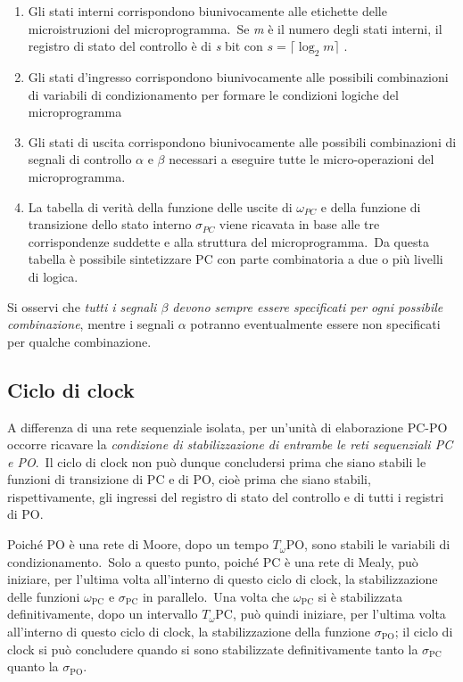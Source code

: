 \begin{enumerate}
    \item Gli stati interni corrispondono biunivocamente alle etichette delle microistruzioni del microprogramma.\ Se \textit{m} è il numero degli stati interni, il registro di stato del controllo è di \textit{s} bit con $s= \lceil \log_2m\rceil$ .
    \item Gli stati d'ingresso corrispondono biunivocamente alle possibili combinazioni di variabili di condizionamento per formare le condizioni logiche del microprogramma
    \item Gli stati di uscita corrispondono biunivocamente alle possibili combinazioni di segnali di controllo $\alpha$ e $\beta$ necessari a eseguire tutte le micro-operazioni del microprogramma.
    \item La tabella di verità della funzione delle uscite di $\omega_{PC}$ e della funzione di transizione dello stato interno $\sigma_{PC}$ viene ricavata in base alle tre corrispondenze suddette e alla struttura del microprogramma.\ Da questa tabella è possibile sintetizzare PC con parte combinatoria a due o più livelli di logica.
\end{enumerate}

\noindent Si osservi che \textit{tutti i segnali $\beta$ devono sempre essere specificati per ogni possibile combinazione}, mentre i segnali $\alpha$ potranno eventualmente essere non specificati per qualche combinazione.

\subsection{Ciclo di clock}

A differenza di una rete sequenziale isolata, per un'unità di elaborazione PC-PO occorre ricavare la \textit{condizione di stabilizzazione di entrambe le reti sequenziali PC e PO}.\
Il ciclo di clock non può dunque concludersi prima che siano stabili le funzioni di transizione di PC e di PO, cioè prima che siano stabili, rispettivamente, gli ingressi del registro di stato del controllo e di tutti i registri di PO.

Poiché PO è una rete di Moore, dopo un tempo $T_\omega\mathrm{PO}$, sono stabili le variabili di condizionamento.\
Solo a questo punto, poiché PC è una rete di Mealy, può iniziare, per l'ultima volta all'interno di questo ciclo di clock, la stabilizzazione delle funzioni $\omega_{\mathrm{PC}}$ e $\sigma_{\mathrm{PC}}$ in parallelo.\
Una volta che $\omega_{\mathrm{PC}}$ si è stabilizzata definitivamente, dopo un intervallo $T_{\omega}\mathrm{PC}$, può quindi iniziare, per l'ultima volta all'interno di questo ciclo di clock, la stabilizzazione della funzione $\sigma_{\mathrm{PO}}$; il ciclo di clock si può concludere quando si sono stabilizzate definitivamente tanto la $\sigma_{\mathrm{PC}}$ quanto la $\sigma_{\mathrm{PO}}$.

